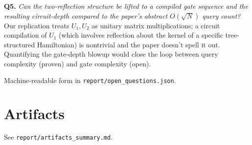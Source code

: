 \documentclass[11pt]{article}
\begin{document}
\textbf{Q5.} \emph{Can the two-reflection structure be lifted to a compiled gate sequence and
the resulting circuit-depth compared to the paper's abstract $O(\sqrt N)$ query count?}
Our replication treats $U_1, U_2$ as unitary matrix multiplications; a circuit compilation
of $U_1$ (which involves reflection about the kernel of a specific tree-structured Hamiltonian)
is nontrivial and the paper doesn't spell it out. Quantifying the gate-depth blowup would
close the loop between query complexity (proven) and gate complexity (open).

Machine-readable form in \texttt{report/open\_questions.json}.

\section*{Artifacts}
See \texttt{report/artifacts\_summary.md}.
\end{document}
